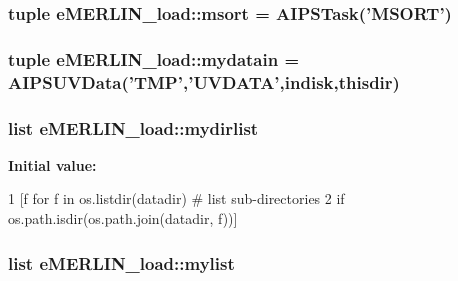 \hypertarget{namespacee_m_e_r_l_i_n__load_afb84c32aea312e44c454e4a19e092400}{
\subsubsection[{msort}]{\setlength{\rightskip}{0pt plus 5cm}tuple {\bf e\-M\-E\-R\-L\-I\-N\-\_\-load\-::msort} = \-A\-I\-P\-S\-Task('\-M\-S\-O\-R\-T')}}\label{namespacee_m_e_r_l_i_n__load_afb84c32aea312e44c454e4a19e092400}
\hypertarget{namespacee_m_e_r_l_i_n__load_a3f0d999720e445ef452d0411be5a71d3}{
\subsubsection[{mydatain}]{\setlength{\rightskip}{0pt plus 5cm}tuple {\bf e\-M\-E\-R\-L\-I\-N\-\_\-load\-::mydatain} = \-A\-I\-P\-S\-U\-V\-Data('\-T\-M\-P','\-U\-V\-D\-A\-T\-A',{\bf indisk},{\bf thisdir})}}\label{namespacee_m_e_r_l_i_n__load_a3f0d999720e445ef452d0411be5a71d3}
\hypertarget{namespacee_m_e_r_l_i_n__load_a25eac8aebede2d2703c105ca1e0b09a2}{
\subsubsection[{mydirlist}]{\setlength{\rightskip}{0pt plus 5cm}list {\bf e\-M\-E\-R\-L\-I\-N\-\_\-load\-::mydirlist}}}\label{namespacee_m_e_r_l_i_n__load_a25eac8aebede2d2703c105ca1e0b09a2}
{\bfseries \-Initial value\-:}
\begin{DoxyCode}
1 [f for f in os.listdir(datadir)         # list sub-directories
2         if os.path.isdir(os.path.join(datadir, f))]
\end{DoxyCode}
\hypertarget{namespacee_m_e_r_l_i_n__load_ab343adec8c60c6e452705f4603f72e0d}{
\subsubsection[{mylist}]{\setlength{\rightskip}{0pt plus 5cm}list {\bf e\-M\-E\-R\-L\-I\-N\-\_\-load\-::mylist}}}\label{namespacee_m_e_r_l_i_n__load_ab343adec8c60c6e452705f4603f72e0d}

